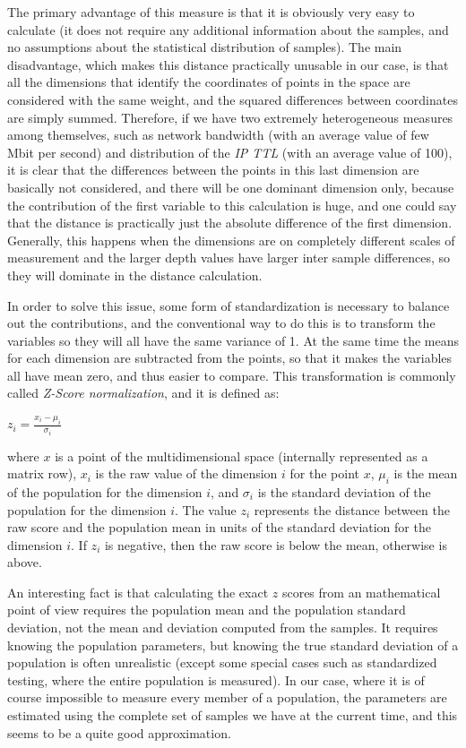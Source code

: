 \documentclass[12pt,a4paper,cucitura]{toptesi}
\begin{document}
The primary advantage of this measure is that it is obviously very easy to calculate (it does not require any additional information about the samples, and no assumptions about the statistical distribution of samples).
The main disadvantage, which makes this distance practically unusable in our case, is that all the dimensions that identify the coordinates of points in the space are considered with the same weight, and the squared differences between coordinates are simply summed.
Therefore, if we have two extremely heterogeneous measures among themselves, such as network bandwidth (with an average value of few Mbit per second) and distribution of the \emph{IP TTL} (with an average value of 100), it is clear that the differences between the points in this last dimension are basically not considered, and there will be one dominant dimension only, because the contribution of the first variable to this calculation is huge, and one could say that the distance is practically just the absolute difference of the first dimension.
Generally, this happens when the dimensions are on completely different scales of measurement and the larger depth values have larger inter sample differences, so they will dominate in the distance calculation.

In order to solve this issue, some form of standardization is necessary to balance out the contributions, and the conventional way to do this is to transform the variables so they will all have the same variance of 1. 
At the same time the means for each dimension are subtracted from the points, so that it makes the variables all have mean zero, and thus easier to compare. 
This transformation is commonly called \emph{Z-Score normalization}, and it is defined as:

\begin{center}
\Large
$z_i = \frac{x_i - \mu_i}{\sigma_i}$
\end{center}

where $x$ is a point of the multidimensional space (internally represented as a matrix row), $x_i$ is the raw value of the dimension $i$ for the point $x$, $\mu_i$ is the mean of the population for the dimension $i$, and $\sigma_i$ is the standard deviation of the population for the dimension $i$.
The value $z_i$ represents the distance between the raw score and the population mean in units of the standard deviation for the dimension $i$. If $z_i$ is negative, then the raw score is below the mean, otherwise is above.

An interesting fact is that calculating the exact $z$ scores from an mathematical point of view requires the population mean and the population standard deviation, not the mean and deviation computed from the samples. 
It requires knowing the population parameters, but knowing the true standard deviation of a population is often unrealistic (except some special cases such as standardized testing, where the entire population is measured).
In our case, where it is of course impossible to measure every member of a population, the parameters are estimated using the complete set of samples we have at the current time, and this seems to be a quite good approximation.
\end{document}
